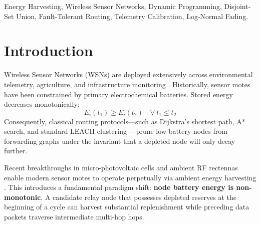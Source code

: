 \documentclass[conference]{IEEEtran}
\begin{document}
\begin{IEEEkeywords}
Energy Harvesting, Wireless Sensor Networks, Dynamic Programming, Disjoint-Set Union, Fault-Tolerant Routing, Telemetry Calibration, Log-Normal Fading.
\end{IEEEkeywords}

\section{Introduction}

Wireless Sensor Networks (WSNs) are deployed extensively across environmental telemetry, agriculture, and infrastructure monitoring \cite{akyildiz2002survey, sah2020renewable}. Historically, sensor motes have been constrained by primary electrochemical batteries. Stored energy decreases monotonically:
\begin{equation}
E_i(t_1) \ge E_i(t_2) \quad \forall\ t_1 \le t_2
\end{equation}
Consequently, classical routing protocols---such as Dijkstra's shortest path, A* search, and standard LEACH clustering \cite{heinzelman2002application}---prune low-battery nodes from forwarding graphs under the invariant that a depleted node will only decay further.

Recent breakthroughs in micro-photovoltaic cells and ambient RF rectennas enable modern sensor motes to operate perpetually via ambient energy harvesting \cite{sudevalayam2011energy, sharma2020energy}. This introduces a fundamental paradigm shift: \textbf{node battery energy is non-monotonic}. A candidate relay node that possesses depleted reserves at the beginning of a cycle can harvest substantial replenishment while preceding data packets traverse intermediate multi-hop hops.
\end{document}
